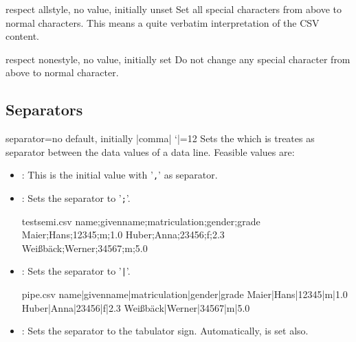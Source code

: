 \documentclass[a4paper,11pt]{ltxdoc}
\begin{document}
\begin{docCsvKey}{respect all}{}{style, no value, initially unset}
  Set all special characters from above to normal characters. This means
  a quite verbatim interpretation of the CSV content.
\end{docCsvKey}

\begin{docCsvKey}{respect none}{}{style, no value, initially set}
  Do not change any special character from above to normal character.
\end{docCsvKey}

\clearpage
\subsection{Separators}\label{sec:separators}%
\begin{docCsvKey}{separator}{=}{no default, initially |comma|}
  \catcode `|=12
  Sets the  which is treates as separator between the data values
  of a data line. Feasible values are:
  \begin{itemize}
  \item{}: This is the initial value with '\texttt{,}' as separator.
  \medskip

  \item{}: Sets the separator to '\texttt{;}'.
\begin{dispExample}
\begin{tcbverbatimwrite}{testsemi.csv}
  name;givenname;matriculation;gender;grade
  Maier;Hans;12345;m;1.0
  Huber;Anna;23456;f;2.3
  Weißbäck;Werner;34567;m;5.0
\end{tcbverbatimwrite}

\end{dispExample}
\medskip

\item{}: Sets the separator to '\texttt{|}'.
\begin{dispExample}
\begin{tcbverbatimwrite}{pipe.csv}
  name|givenname|matriculation|gender|grade
  Maier|Hans|12345|m|1.0
  Huber|Anna|23456|f|2.3
  Weißbäck|Werner|34567|m|5.0
\end{tcbverbatimwrite}

\end{dispExample}
\medskip

\item{}: Sets the separator to the tabulator sign.
  Automatically,  is set also.
  \end{itemize}
\end{docCsvKey}
\end{document}
